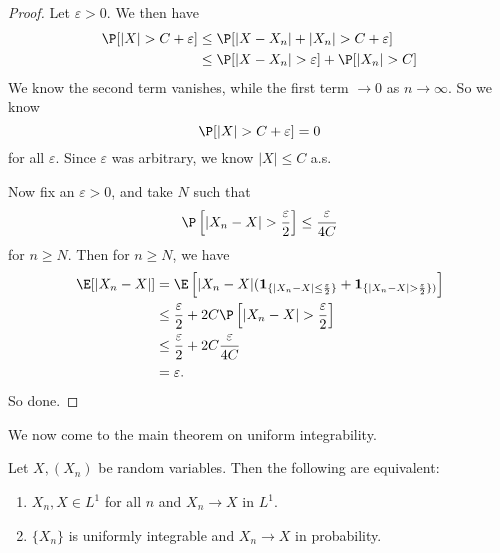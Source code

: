 \documentclass[a4paper]{article}
\begin{document}
\begin{proof}
  Let $\varepsilon > 0$. We then have
  \begin{align*}
    \P[|X| > C+ \varepsilon] &\leq \P[|X - X_n| + |X_n| > C + \varepsilon]\\
    &\leq \P[|X - X_n|> \varepsilon] + \P[|X_n| > C]
  \end{align*}
  We know the second term vanishes, while the first term $\to 0$ as $n \to \infty$. So we know
  \[
    \P[|X| > C + \varepsilon] = 0
  \]
  for all $\varepsilon$. Since $\varepsilon$ was arbitrary, we know $|X| \leq C$ a.s.

  Now fix an $\varepsilon > 0$, and take $N$ such that
  \[
    \P\left[|X_n - X| > \frac{\varepsilon}{2}\right] \leq \frac{\varepsilon}{4C}
  \]
  for $n \geq N$. Then for $n \geq N$, we have
  \begin{align*}
    \E[|X_n - X|] &= \E\left[|X_n - X|(\mathbf{1}_{\{|X_n - X| \leq \frac{\varepsilon}{2}\}} + \mathbf{1}_{\{|X_n - X| > \frac{\varepsilon}{2}\})}\right]\\
    &\leq \frac{\varepsilon}{2} + 2C \P\left[|X_n - X| > \frac{\varepsilon}{2}\right]\\
    &\leq \frac{\varepsilon}{2} + 2C \frac{\varepsilon}{4C}\\
    &= \varepsilon.
  \end{align*}
  So done.
\end{proof}

We now come to the main theorem on uniform integrability.
\begin{thm}
  Let $X, (X_n)$ be random variables. Then the following are equivalent:
  \begin{enumerate}
    \item $X_n, X \in L^1$ for all $n$ and $X_n \to X$ in $L^1$.
    \item $\{X_n\}$ is uniformly integrable and $X_n \to X$ in probability.
  \end{enumerate}
\end{thm}
\end{document}
